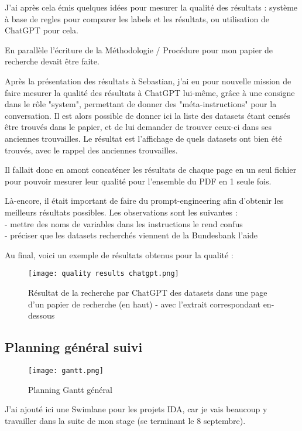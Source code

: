 J'ai après cela émis quelques idées pour mesurer la qualité des résultats : système à base de regles pour comparer les labels et les résultats, ou utilisation de ChatGPT pour cela.

En parallèle l'écriture de la Méthodologie / Procédure pour mon papier de recherche devait être faite.

Après la présentation des résultats à Sebastian, j'ai eu pour nouvelle mission de faire mesurer la qualité des résultats à ChatGPT lui-même, grâce à une consigne dans le rôle "system", permettant de donner des "méta-instructions" pour la conversation.
Il est alors possible de donner ici la liste des datasets étant censés être trouvés dans le papier, et de lui demander de trouver ceux-ci dans ses anciennes trouvailles.
Le résultat est l'affichage de quels datasets ont bien été trouvés, avec le rappel des anciennes trouvailles.

Il fallait donc en amont concaténer les résultats de chaque page en un seul fichier pour pouvoir mesurer leur qualité pour l'ensemble du PDF en 1 seule fois.

Là-encore, il était important de faire du prompt-engineering afin d'obtenir les meilleurs résultats possibles. Les observations sont les suivantes :\\
- mettre des noms de variables dans les instructions le rend confus\\
- préciser que les datasets recherchés viennent de la Bundesbank l’aide

Au final, voici un exemple de résultats obtenus pour la qualité :

\begin{figure}[H]
    \centering
    \texttt{[image: quality results chatgpt.png]}
    \caption{Résultat de la recherche par ChatGPT des datasets dans une page d'un papier de recherche (en haut) - avec l'extrait correspondant en-dessous}
\end{figure}


\subsection{Planning général suivi}

\begin{figure}[H]
    \centering
    \texttt{[image: gantt.png]}
    \caption{Planning Gantt général}
\end{figure}

J'ai ajouté ici une Swimlane pour les projets IDA, car je vais beaucoup y travailler dans la suite de mon stage (se terminant le 8 septembre).

